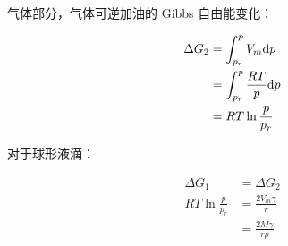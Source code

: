 气体部分，气体可逆加油的 Gibbs 自由能变化：

\begin{align}
    \Delta G_2 & = \int_{p_r}^p V_m \mathrm{d} p          \\
               & = \int_{p_r}^p \frac{RT}{p} \mathrm{d} p \\
               & = RT \ln \frac{p}{p_r}
\end{align}

对于球形液滴：

\begin{align}
    \Delta G_1           & = \Delta G_2              \\
    RT \ln \frac{p}{p_r} & = \frac{2V_m \gamma}{r}   \\
                         & = \frac{2M\gamma}{r \rho}
\end{align}
